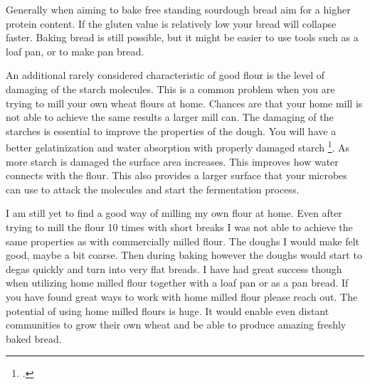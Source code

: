 \begin{table}[]
  \centering
  \caption{\label{tab:w-value}An overview of different levels of W values and the respective hydrations and fermentation times}
\end{table}


Generally when aiming to
bake free standing sourdough bread aim for a higher protein content. If the
gluten value is relatively low your bread will collapse faster. Baking bread
is still possible, but it might be easier to use tools such as a loaf pan, or
to make pan bread.

An additional rarely considered characteristic of good flour is the level of damaging of the
starch molecules. This is a common problem when you are trying to mill your own wheat flours at
home. Chances are that your home mill is not able to achieve the same results
a larger mill can. The damaging of the starches is essential to improve the
properties of the dough. You will have a better gelatinization and water
absorption with properly damaged starch \footcite{starch+damage+flour}. As more
starch is damaged the surface area increases. This improves how water connects with the flour.
This also provides a larger surface that your microbes can use to attack the molecules 
and start the fermentation process.

I am still
yet to find a good way of milling my own flour at home. Even after trying to
mill the flour 10 times with short breaks I was not able to achieve the same
properties as with commercially milled flour. The doughs I would make felt
good, maybe a bit coarse. Then during baking however the doughs would start to
degas quickly and turn into very flat breads. I have had great success though when
utilizing home milled flour together with a loaf pan or as a pan bread. If you
have found great ways to work with home milled flour please reach out. The potential
of using home milled flours is huge. It would enable even distant communities
to grow their own wheat and be able to produce amazing freshly baked bread.
